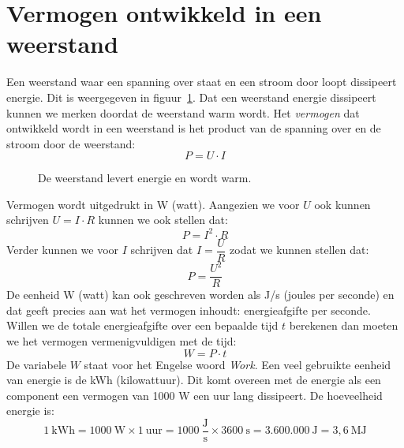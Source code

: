 \section{Vermogen ontwikkeld in een weerstand}
Een weerstand waar een spanning over staat en een stroom door loopt dissipeert energie. Dit is weergegeven in
figuur~\ref{fig:gelvermogensdissipatie}. Dat een weerstand energie dissipeert kunnen we merken doordat de
weerstand warm wordt.
Het \textsl{vermogen} dat ontwikkeld wordt in een weerstand is het product van de spanning over
en de stroom door de weerstand:
%
\begin{equation}
P = U\cdot I 
\end{equation}

\begin{figure}[!ht]
\centering
{}
\caption{De weerstand levert energie en wordt warm.}
\label{fig:gelvermogensdissipatie}
\end{figure}


Vermogen wordt uitgedrukt in W (watt). Aangezien we voor $U$ ook kunnen schrijven $U=I\cdot R$
kunnen we ook stellen dat:
\begin{equation}
P = I^2\cdot R
\end{equation}
Verder kunnen we voor $I$ schrijven dat $I=\dfrac{U}{R}$ zodat we kunnen stellen dat:
\begin{equation}
P = \dfrac{U^2}{R}
\end{equation}
%
De eenheid W (watt) kan ook geschreven worden als J/s (joules per seconde) en dat geeft precies
aan wat het vermogen inhoudt: energieafgifte per seconde. Willen we de totale energieafgifte
over een bepaalde tijd $t$ berekenen dan moeten we het vermogen vermenigvuldigen met de tijd:
%
\begin{equation}
W = P\cdot t
\end{equation}
%
De variabele $W$ staat voor het Engelse woord \textsl{Work}. Een veel gebruikte eenheid van energie
is de kWh (kilowattuur). Dit komt overeen met de energie
als een component een vermogen van 1000 W een uur lang dissipeert. De hoeveelheid energie is:
%
\begin{equation}
1\ \mathrm{kWh} = 1000\ \mathrm{W} \times 1\ \mathrm{uur} = 1000\ \dfrac{\mathrm{J}}{\mathrm{s}} \times 3600\ \mathrm{s} = 3.600.000\ \mathrm{J} = 3,6\ \mathrm{MJ}
\end{equation}

